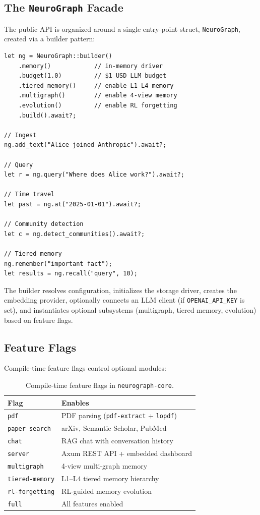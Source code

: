 \documentclass[11pt,twocolumn]{article}
\begin{document}
\subsection{The \texttt{NeuroGraph} Facade}

The public API is organized around a single entry-point struct, \texttt{NeuroGraph}, created via a builder pattern:

\begin{lstlisting}[style=rustcode,caption={Builder pattern and core API}]
let ng = NeuroGraph::builder()
    .memory()            // in-memory driver
    .budget(1.0)         // $1 USD LLM budget
    .tiered_memory()     // enable L1-L4 memory
    .multigraph()        // enable 4-view memory
    .evolution()         // enable RL forgetting
    .build().await?;

// Ingest
ng.add_text("Alice joined Anthropic").await?;

// Query
let r = ng.query("Where does Alice work?").await?;

// Time travel
let past = ng.at("2025-01-01").await?;

// Community detection
let c = ng.detect_communities().await?;

// Tiered memory
ng.remember("important fact");
let results = ng.recall("query", 10);
\end{lstlisting}

The builder resolves configuration, initializes the storage driver, creates the embedding provider, optionally connects an LLM client (if \texttt{OPENAI\_API\_KEY} is set), and instantiates optional subsystems (multigraph, tiered memory, evolution) based on feature flags.

\subsection{Feature Flags}

Compile-time feature flags control optional modules:

\begin{table}[h]
\centering\small
\begin{tabular}{@{}ll@{}}
\toprule
\textbf{Flag} & \textbf{Enables} \\
\midrule
\texttt{pdf} & PDF parsing (\texttt{pdf-extract} + \texttt{lopdf}) \\
\texttt{paper-search} & arXiv, Semantic Scholar, PubMed \\
\texttt{chat} & RAG chat with conversation history \\
\texttt{server} & Axum REST API + embedded dashboard \\
\texttt{multigraph} & 4-view multi-graph memory \\
\texttt{tiered-memory} & L1--L4 tiered memory hierarchy \\
\texttt{rl-forgetting} & RL-guided memory evolution \\
\texttt{full} & All features enabled \\
\bottomrule
\end{tabular}
\caption{Compile-time feature flags in \texttt{neurograph-core}.}
\label{tab:features}
\end{table}
\end{document}
